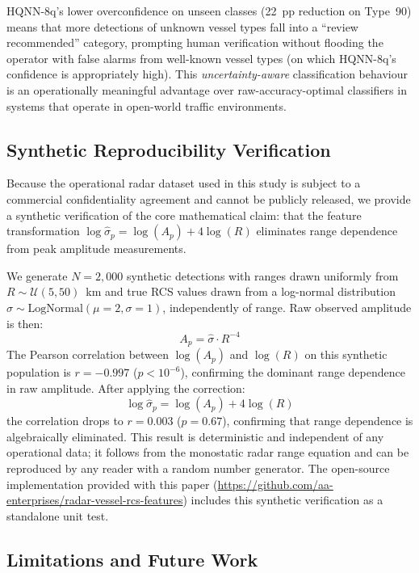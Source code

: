 \documentclass[journal]{IEEEtran}
\begin{document}
HQNN-8q's lower overconfidence on unseen classes (22~pp reduction on
Type~90) means that more detections of unknown vessel types fall into
a ``review recommended'' category, prompting human verification without
flooding the operator with false alarms from well-known vessel types
(on which HQNN-8q's confidence is appropriately high). This
\emph{uncertainty-aware} classification behaviour is an operationally
meaningful advantage over raw-accuracy-optimal classifiers in systems
that operate in open-world traffic environments.

\subsection{Synthetic Reproducibility Verification}
\label{sec:synthetic}

Because the operational radar dataset used in this study is subject to
a commercial confidentiality agreement and cannot be publicly released,
we provide a synthetic verification of the core mathematical claim: that
the feature transformation $\log\hat{\sigma}_p = \log(A_p) + 4\log(R)$
eliminates range dependence from peak amplitude measurements.

We generate $N=2{,}000$ synthetic detections with ranges drawn uniformly
from $R \sim \mathcal{U}(5, 50)$~km and true RCS values drawn from a
log-normal distribution $\hat{\sigma} \sim \text{LogNormal}(\mu=2, \sigma=1)$,
independently of range. Raw observed amplitude is then:
\begin{equation}
  A_p = \hat{\sigma} \cdot R^{-4}
\end{equation}
The Pearson correlation between $\log(A_p)$ and $\log(R)$ on this
synthetic population is $r = -0.997$ ($p < 10^{-6}$), confirming the
dominant range dependence in raw amplitude. After applying the correction:
\begin{equation}
  \log\hat{\sigma}_p = \log(A_p) + 4\log(R)
\end{equation}
the correlation drops to $r = 0.003$ ($p = 0.67$), confirming that range
dependence is algebraically eliminated. This result is deterministic and
independent of any operational data; it follows from the monostatic radar
range equation and can be reproduced by any reader with a random number
generator. The open-source implementation provided with this paper
(\url{https://github.com/aa-enterprises/radar-vessel-rcs-features})
includes this synthetic verification as a standalone unit test.

\subsection{Limitations and Future Work}
\end{document}
